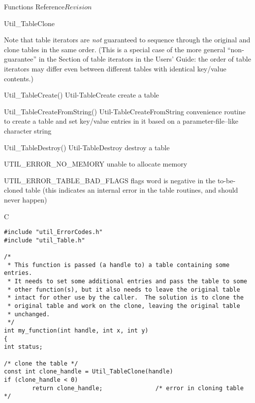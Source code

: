 \begin{cactuspart}{ Functions Reference}{}{$Revision$}
\begin{FunctionDescription}{Util\_TableClone}
\begin{Discussion}
Note that table iterators are {\em not\/} guaranteed to sequence
through the original and clone tables in the same order.  (This
is a special case of the more general ``non-guarantee'' in
the Section of table iterators in the Users' Guide:
the order of table iterators may differ even between different
tables with identical key/value contents.)
\end{Discussion}

\begin{SeeAlsoSection}
\begin{SeeAlso2} {Util\_TableCreate()} {Util-TableCreate}
create a table
\end{SeeAlso2}
\begin{SeeAlso2} {Util\_TableCreateFromString()} {Util-TableCreateFromString}
convenience routine to create a table and set key/value entries
in it based on a parameter-file--like character string
\end{SeeAlso2}
\begin{SeeAlso2} {Util\_TableDestroy()} {Util-TableDestroy}
destroy a table
\end{SeeAlso2}
\end{SeeAlsoSection}

\begin{ErrorSection}
\begin{Error}{UTIL\_ERROR\_NO\_MEMORY}
unable to allocate memory
\end{Error}
\begin{Error}{UTIL\_ERROR\_TABLE\_BAD\_FLAGS}
flags word is negative in the to-be-cloned table
(this indicates an internal error in the table routines,
and should never happen)
\end{Error}
\end{ErrorSection}

\begin{ExampleSection}
\begin{Example}{C}
\begin{verbatim}
#include "util_ErrorCodes.h"
#include "util_Table.h"

/*
 * This function is passed (a handle to) a table containing some entries.
 * It needs to set some additional entries and pass the table to some
 * other function(s), but it also needs to leave the original table
 * intact for other use by the caller.  The solution is to clone the
 * original table and work on the clone, leaving the original table
 * unchanged.
 */
int my_function(int handle, int x, int y)
{
int status;

/* clone the table */
const int clone_handle = Util_TableClone(handle)
if (clone_handle < 0)
        return clone_handle;               /* error in cloning table */


\end{verbatim}
\end{Example}
\end{ExampleSection}
\end{FunctionDescription}
\end{cactuspart}
